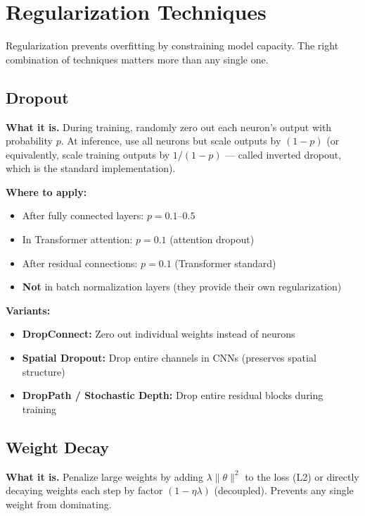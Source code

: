 \section{Regularization Techniques}
\label{sec:regularization}

Regularization prevents overfitting by constraining model capacity. The right combination of techniques matters more than any single one.

\subsection{Dropout}

\textbf{What it is.} During training, randomly zero out each neuron's output with probability $p$. At inference, use all neurons but scale outputs by $(1-p)$ (or equivalently, scale training outputs by $1/(1-p)$ --- called inverted dropout, which is the standard implementation).

\textbf{Where to apply:}
\begin{itemize}
    \item After fully connected layers: $p = 0.1$--$0.5$
    \item In Transformer attention: $p = 0.1$ (attention dropout)
    \item After residual connections: $p = 0.1$ (Transformer standard)
    \item \textbf{Not} in batch normalization layers (they provide their own regularization)
\end{itemize}

\textbf{Variants:}
\begin{itemize}
    \item \textbf{DropConnect:} Zero out individual weights instead of neurons
    \item \textbf{Spatial Dropout:} Drop entire channels in CNNs (preserves spatial structure)
    \item \textbf{DropPath / Stochastic Depth:} Drop entire residual blocks during training
\end{itemize}

\subsection{Weight Decay}

\textbf{What it is.} Penalize large weights by adding $\lambda\|\theta\|^2$ to the loss (L2) or directly decaying weights each step by factor $(1 - \eta\lambda)$ (decoupled). Prevents any single weight from dominating.

